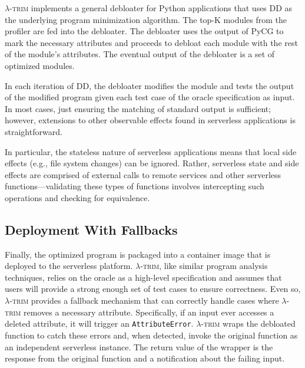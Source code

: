 \documentclass[sigplan,nonacm]{acmart}
\newcommand{\sys}{\textsc{\ensuremath{\lambda}-trim}\xspace}
\begin{document}
\sys implements a general debloater for Python applications that uses DD as the underlying program minimization algorithm.
The top-K modules from the profiler are fed into the debloater.
The debloater uses the output of PyCG to mark the necessary attributes and proceeds to debloat each module with the rest of the module's attributes.
The eventual output of the debloater is a set of optimized modules.



In each iteration of DD, the debloater modifies the module and tests the output of the modified program given each test case of the oracle specification as input.
In most cases, just ensuring the matching of standard output is sufficient;
however, extensions to other observable effects found in serverless applications is straightforward.

In particular, the stateless nature of serverless applications means that local side effects (e.g., file system changes) can be ignored.
Rather, serverless state and side effects are comprised of external calls to remote services and other serverless functions---validating these types of functions involves intercepting such operations and checking for equivalence.








%
 
\subsection{Deployment With Fallbacks}\label{sec:fallback}






Finally, the optimized program is packaged into a container image that is deployed to the serverless platform.
\sys, like similar program analysis techniques, relies on the oracle as a high-level specification and assumes that users will provide a strong enough set of test cases to ensure correctness.
Even so, \sys provides a fallback mechanism that can correctly handle cases where \sys removes a necessary attribute.
Specifically, if an input ever accesses a deleted attribute, it will trigger an \texttt{AttributeError}.
\sys wraps the debloated function to catch these errors and, when detected, invoke the original function as an independent serverless instance. 
The return value of the wrapper is the response from the original function and a notification about the failing input.
\end{document}

